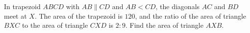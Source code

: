 In trapezoid $ABCD$ with $AB\parallel CD$ and $AB<CD$, the diagonals $AC$ and $BD$ meet at $X$. The area of the trapezoid is $120$, and the ratio of the area of triangle $BXC$ to the area of triangle $CXD$ is $2:9$. Find the area of triangle $AXB$.
